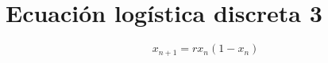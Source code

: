 \section{Ecuación logística discreta 3}
\begin{equation*}
  x_{n+1}=rx_n(1-x_n) 
\end{equation*}
\begin{comment}
  las lineas blancas de la gráfica quieren decir 
  el diagrama de órbitas nos dicen que para un valor de $r$ cuales son los valores que alcanzan la solución ya después que t tiende a infinito
  tomando $r=3.7$ y en el eje  $x$ estamos graficando para tiempos muy grandes los valores que toman la solución, entonces 
  
  diagrama de órbitas, nosotros  simulamos x_n para n muy grande, para cada valor de r, con condiciones iniciales  aleatorias, graficamos un punto
  en el valor de, para x<1 solo veíamos una linea en hasta x=1, para 1 a 3 teníamos un punto de equilibrio estable, por lo que solo vemos una sola linea
  por que todas las condiciones iniciales convergían  al punto de equilibrio, para r=3 había un doblamiento de periodo, entonces ya no había punto de equilibrio estable
  dependiendo de la condición inicial  el a_n podía quedar en el punto de arriba o de abajo, en 3.4 había otro doblamiento de periodo, entonces el ciclo de periodo 2 inestable 
  se convertía en un ciclo de periodo 4.
  Los manchones blancos son soluciones caóticas y se les llaman ventanas periódicas , lo azul son soluciones periódicas.

  recuerda que las bifurcaciones en donde de la nada aparecen 2 puntos de equilibrio se le llama "nodo silla" 

  Soluciones intermitentes: si nos fijamos en cierto punto en n, parece que la solución tiene cierta periocidad, pero despues de cierto n hace cosas aleatorias -> periodicas -> aleatoriedad -> periocidad

  Gráfica tercer iterado para $r \simeq 3.79$ (3er iterado nos va a decir como se comporta la solución 3 puntos despues $x_n + 3$)


\end{comment}

